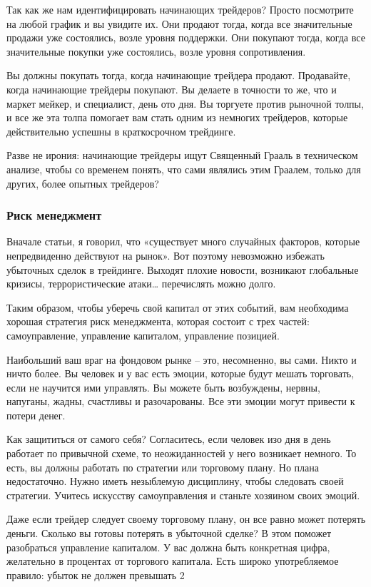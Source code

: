 \documentclass{book}
\begin{document}
Так как же нам идентифицировать начинающих трейдеров? Просто посмотрите на любой график и вы увидите их. Они продают тогда, когда все значительные продажи уже состоялись, возле уровня поддержки. Они покупают тогда, когда все значительные покупки уже состоялись, возле уровня сопротивления.

Вы должны покупать тогда, когда начинающие трейдера продают. Продавайте, когда начинающие трейдеры покупают. Вы делаете в точности то же, что и маркет мейкер, и специалист, день ото дня. Вы торгуете против рыночной толпы, и все же эта толпа помогает вам стать одним из немногих трейдеров, которые действительно успешны в краткосрочном трейдинге.

Разве не ирония: начинающие трейдеры ищут Священный Грааль в
техническом анализе, чтобы со временем понять, что сами являлись этим
Граалем, только для других, более опытных трейдеров?

\subsubsection{Риск менеджмент}

Вначале статьи, я говорил, что «существует много случайных факторов, которые непредвиденно действуют на рынок». Вот поэтому невозможно избежать убыточных сделок в трейдинге. Выходят плохие новости, возникают глобальные кризисы, террористические атаки… перечислять можно долго.

Таким образом, чтобы уберечь свой капитал от этих событий, вам необходима хорошая стратегия риск менеджмента, которая состоит с трех частей: самоуправление, управление капиталом, управление позицией.

Наибольший ваш враг на фондовом рынке – это, несомненно, вы сами. Никто и ничто более. Вы человек и у вас есть эмоции, которые будут мешать торговать, если не научится ими управлять. Вы можете быть возбуждены, нервны, напуганы, жадны, счастливы и разочарованы. Все эти эмоции могут привести к потери денег.

Как защититься от самого себя? Согласитесь, если человек изо дня в день работает по привычной схеме, то неожиданностей у него возникает немного. То есть, вы должны работать по стратегии или торговому плану. Но плана недостаточно. Нужно иметь незыблемую дисциплину, чтобы следовать своей стратегии. Учитесь искусству самоуправления и станьте хозяином своих эмоций.

Даже если трейдер следует своему торговому плану, он все равно может потерять деньги. Сколько вы готовы потерять в убыточной сделке? В этом поможет разобраться управление капиталом. У вас должна быть конкретная цифра, желательно в процентах от торгового капитала. Есть широко употребляемое правило: убыток не должен превышать 2%
\end{document}
